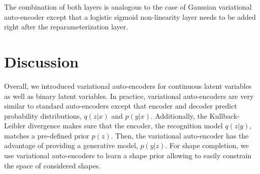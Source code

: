 The combination of both layers is analogous to the case of Gaussian
variational auto-encoder except that a logistic sigmoid
non-linearity layer needs to be added right after the reparameterization layer.

\section{Discussion}

Overall, we introduced variational
auto-encoders for continuous latent variables as well as binary
latent variables. In practice, variational auto-encoders
are very similar to standard auto-encoders except that encoder and decoder
predict probability distributions, \ie $q(z | x)$ and $p(y | x)$.
Additionally, the Kullback-Leibler divergence makes sure
that the encoder, \ie the recognition model $q(z | y)$, matches a pre-defined
prior $p(z)$. Then, the variational auto-encoder has the advantage of providing
a generative model, \ie $p(y | z)$. For shape completion, we use variational
auto-encoders to learn a shape prior allowing to easily constrain the space of
considered shapes. 
